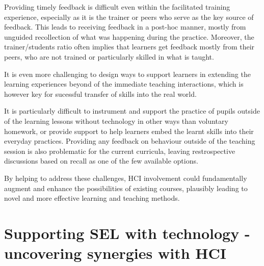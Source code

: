 \documentclass[prodmode,acmtochi]{acmsmall}
\begin{document}
Providing timely feedback is difficult even within the facilitated training experience, especially as it is the trainer or peers who serve as the key source of feedback. This leads to receiving feedback in a post-hoc manner, mostly from unguided recollection of what was happening during the practice. Moreover, the trainer/students ratio often implies that learners get feedback mostly from their peers, who are not trained or particularly skilled in what is taught.  

It is even more challenging to design ways to support learners in extending the learning experiences beyond of the immediate teaching interactions, which is however key for sucessful transfer of skills into the real world. 

It is particularly difficult to instrument and support the practice of pupils outside of the learning lessons without technology in other ways than voluntary homework, or provide support to help learners embed the learnt skills into their everyday practices. Providing any feedback on behaviour outside of the teaching session is also problematic for the current curricula, leaving restrospective discussions based on recall as one of the few available options. 

By helping to address these challenges, HCI involvement could fundamentally augment and enhance the possibilities of existing courses, plausibly leading to novel and more effective learning and teaching methods. 



\fi



\section{Supporting SEL with technology - uncovering synergies with HCI }
\label{sec:HCIsupport}
\end{document}

